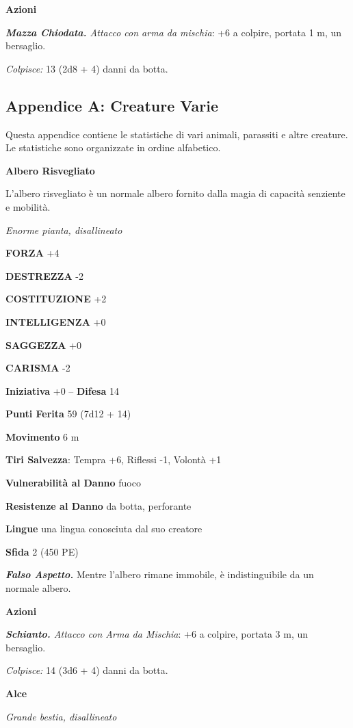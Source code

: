 \begin{multicols}{2}
\textbf{Azioni}

\emph{\textbf{Mazza Chiodata.} Attacco con arma da mischia}: +6 a colpire, portata 1 m, un bersaglio.

\emph{Colpisce:} 13 (2d8 + 4) danni da botta.


\subsection{Appendice A: Creature Varie}

Questa appendice contiene le statistiche di vari animali, parassiti e
altre creature. Le statistiche sono organizzate in ordine alfabetico.

\medskip\textbf{Albero Risvegliato}

L'albero risvegliato è un normale albero fornito dalla magia di capacità
senziente e mobilità.

\emph{Enorme pianta, disallineato}

\textbf{FORZA} +4

\textbf{DESTREZZA} -2

\textbf{COSTITUZIONE} +2

\textbf{INTELLIGENZA} +0

\textbf{SAGGEZZA} +0

\textbf{CARISMA} -2

\textbf{Iniziativa} +0 -- \textbf{Difesa} 14

\textbf{Punti Ferita} 59 (7d12 + 14)

\textbf{Movimento} 6 m

\textbf{Tiri Salvezza}: Tempra +6, Riflessi -1, Volontà +1

\textbf{Vulnerabilità al Danno} fuoco

\textbf{Resistenze al Danno} da botta, perforante

\textbf{Lingue} una lingua conosciuta dal suo creatore

\textbf{Sfida} 2 (450 PE)

\emph{\textbf{Falso Aspetto.}} Mentre l'albero rimane immobile, è indistinguibile da un normale albero.

\textbf{Azioni}

\emph{\textbf{Schianto.} Attacco con Arma da Mischia}: +6 a colpire, portata 3 m, un bersaglio.

\emph{Colpisce:} 14 (3d6 + 4) danni da botta.

\medskip\textbf{Alce}

\emph{Grande bestia, disallineato}


\end{multicols}

